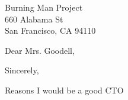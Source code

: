 




	{Burning Man Project
	\\660 Alabama St
	\\San Francisco, CA 94110}

\date{January 10, 2020}
\opening{Dear Mrs. Goodell,}
\closing{Sincerely,}
\makelettertitle

Reasons I would be a good CTO

\makeletterclosing


\clearpage




